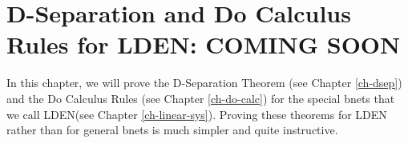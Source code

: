 \chapter{D-Separation and Do Calculus
Rules for LDEN: COMING SOON}
\label{ch-dsep-lden}
In this chapter,
we will prove the D-Separation Theorem
(see Chapter \ref{ch-dsep}) and
the Do Calculus Rules (see Chapter \ref{ch-do-calc})
for the special bnets that we call
LDEN(see Chapter \ref{ch-linear-sys}). Proving these theorems for LDEN
rather than for general bnets
is much simpler and quite
instructive.


